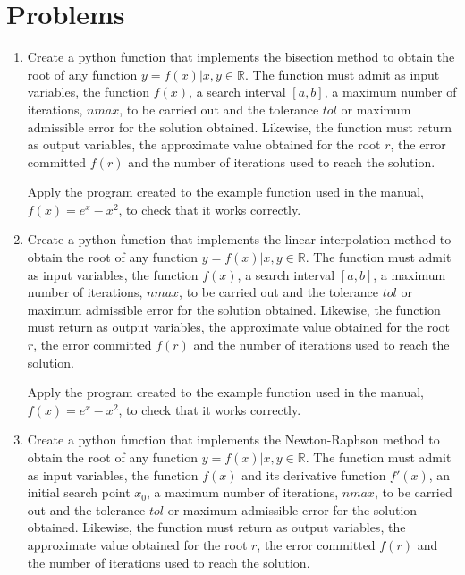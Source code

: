 \begin{paracol}{2}
\begin{enumerate}
\begin{enumerate}
\end{enumerate}

\end{enumerate}
\switchcolumn
\section{Problems}
\begin{enumerate}
\item 
Create a python function that implements the bisection method to obtain the root of any function $y = f(x)\vert x, y \in \mathbb{R}$. The function must admit as input variables, the function $f(x)$, a search interval $[a,b]$, a maximum number of iterations, $nmax$, to be carried out and the tolerance $tol$ or maximum admissible error for the solution obtained. Likewise, the function must return as output variables, the approximate value obtained for the root $r$, the error committed $f(r)$ and the number of iterations used to reach the solution. 

Apply the program created to the example function used in the manual, $f(x) = e^x-x^2$, to check that it works correctly.

\item Create a python function that implements the linear interpolation method to obtain the root of any function $y = f(x)\vert x, y \in \mathbb{R}$. The function must admit as input variables, the function $f(x)$, a search interval $[a,b]$, a maximum number of iterations, $nmax$, to be carried out and the tolerance $tol$ or maximum admissible error for the solution obtained. Likewise, the function must return as output variables, the approximate value obtained for the root $r$, the error committed $f(r)$ and the number of iterations used to reach the solution.

Apply the program created to the example function used in the manual, $f(x) = e^x-x^2$, to check that it works correctly.

\item Create a python function that implements the Newton-Raphson method to obtain the root of any function $y = f(x)\vert x, y \in \mathbb{R}$. The function must admit as input variables, the function $f(x)$ and its derivative function $f'(x)$, an initial search point $x_0$, a maximum number of iterations, $nmax$, to be carried out and the tolerance $tol$ or maximum admissible error for the solution obtained. Likewise, the function must return as output variables, the approximate value obtained for the root $r$, the error committed $f(r)$ and the number of iterations used to reach the solution.


\end{enumerate}
\end{paracol}
